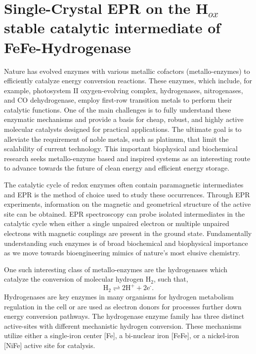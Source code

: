 \chapter[Single-Crystal EPR on FeFe-Hydrogenase]{Single-Crystal EPR on the H$_{ox}$ stable catalytic intermediate of FeFe-Hydrogenase}

Nature has evolved enzymes with various metallic cofactors (metallo-enzymes) to efficiently catalyze energy conversion reactions. These enzymes, which include, for example, photosystem II oxygen-evolving complex\cite{CoxOEC}, hydrogenases\cite{lubitzhyd}, nitrogenases\cite{Hoffman2014rev}, and CO dehydrogenase\cite{C5CS00182J}, employ first-row transition metals to perform their catalytic functions. One of the main challenges is to fully understand these enzymatic mechanisms and provide a basis for cheap, robust, and highly active molecular catalysts designed for practical applications. \cite{Lewis15729} The ultimate goal is to alleviate the requirement of noble metals, such as platinum, that limit the scalability of current technology. This important biophysical and biochemical research seeks metallo-enzyme based and inspired systems as an interesting route to advance towards the future of clean energy and efficient energy storage. \cite{schlogl2012chemical}

The catalytic cycle of redox enzymes often contain paramagnetic intermediates and EPR is the method of choice used to study these occurrences. Through EPR experiments, information on the magnetic and geometrical structure of the active site can be obtained. EPR spectroscopy can probe isolated intermediates in the catalytic cycle when either a single unpaired electron or multiple unpaired electrons with magnetic couplings are present in the ground state. Fundamentally understanding such enzymes is of broad biochemical and biophysical importance as we move towards bioengineering mimics of nature’s most elusive chemistry. \cite{WATANABE20171}

One such interesting class of metallo-enzymes are the hydrogenases\cite{lubitzhyd} which catalyze the conversion of molecular hydrogen H$_2$, such that,
\begin{equation}
    \text{H}_2 \rightleftharpoons 2 \text{H}^+ + 2\text{e}^{\text{-}}.
\end{equation}
Hydrogenases are key enzymes in many organisms for hydrogen metabolism regulation in the cell or are used as electron donors for processes further down energy conversion pathways. The hydrogenase enzyme family has three distinct active-sites with different mechanistic hydrogen conversion. These mechanisms utilize either a single-iron center [Fe], a bi-nuclear iron [FeFe], or a nickel-iron [NiFe] active site for catalysis.

